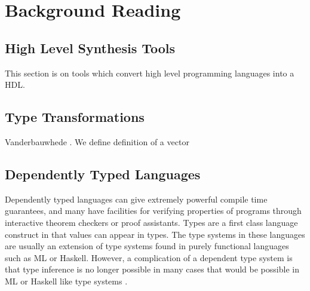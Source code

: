 \section{Background Reading}

\subsection{High Level Synthesis Tools}

This section is on tools which convert high level programming languages into a HDL.

%


\subsection{Type Transformations}
Vanderbauwhede \cite{transformations}. We define definition of a vector 

\subsection{Dependently Typed Languages}

Dependently typed languages can give extremely powerful compile time guarantees, and many have facilities for
verifying properties of programs through interactive theorem checkers or proof assistants. Types are a first class language 
construct in that values can appear in types. The type systems
in these languages are usually an extension of type systems found in purely functional languages such as ML or Haskell.
However, a complication of a dependent type system is that type inference is no longer possible in
many cases that would be possible in ML or Haskell like type systems \cite{practicalDependent}.


